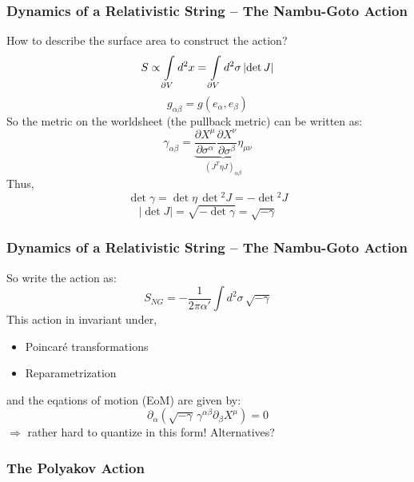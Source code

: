 \documentclass[aspectratio=169]{beamer}
\begin{document}
	\begin{frame}
		\frametitle{Dynamics of a Relativistic String -- The Nambu-Goto Action}
		How to describe the surface area to construct the action?
		\begin{equation*}
			S \propto \int\displaylimits_{\partial V} d^2x = \int\displaylimits_{\partial V}d^2\sigma \left| \det J \right|
		\end{equation*}
		\color{red}{For this, first remember that any metric is given by:}
		\begin{equation*}
			g_{\alpha\beta} = g(e_\alpha,e_\beta)
		\end{equation*}
		\color{black}
		So the metric on the worldsheet (the pullback metric) can be written as:
		\begin{equation*}
			\gamma_{\alpha\beta} = \underbrace{\frac{\partial X^\mu}{\partial\sigma^\alpha} \frac{\partial X^\nu}{\partial\sigma^\beta} \eta_{\mu\nu}}_{(J^T \eta J)_{\alpha\beta}}
		\end{equation*}
		Thus,
		\begin{equation*}
			\det \gamma = \det\eta \, \det{^2} J = - \det{^2} J
		\end{equation*}
		\begin{equation*}
			\left| \det J \right| = \sqrt{-\det\gamma} = \sqrt{-\gamma}
		\end{equation*}
	\end{frame}

	\begin{frame}
		\frametitle{Dynamics of a Relativistic String -- The Nambu-Goto Action}
		So write the action as:
		\begin{equation*}
			S_{NG} = -\frac{1}{2\pi\alpha'} \int d^2\sigma \, \sqrt{-\gamma}
		\end{equation*}
		This action in invariant under,
		\begin{itemize}
			\item Poincaré transformations
			\item Reparametrization
		\end{itemize}
		and the eqations of motion (EoM) are given by:
		\begin{equation*}
			\partial_\alpha\left(\sqrt{-\gamma}\,\gamma^{\alpha\beta}\partial_\beta X^\mu\right) = 0
		\end{equation*}
		$\Rightarrow$ rather hard to quantize in this form! Alternatives?
	\end{frame}

	\subsubsection{The Polyakov Action}
\end{document}
